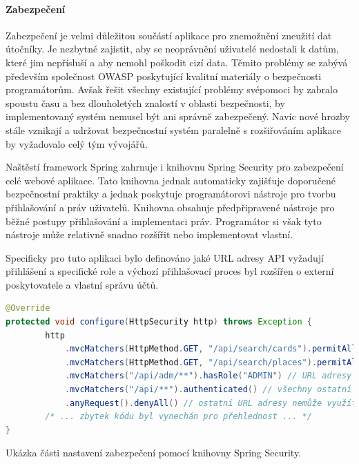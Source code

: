 \begin{itemize}
\begin{itemize}
			\paragraph{Zabezpečení}

			Zabezpečení je velmi důležitou součástí aplikace pro znemožnění zneužití dat útočníky.
			Je nezbytné zajistit, aby se neoprávnění uživatelé nedostali k datům, které jim nepřísluší a aby nemohl
			poškodit cizí data.
			Těmito problémy se zabývá především společnost OWASP poskytující kvalitní materiály o bezpečnosti programátorům.
			Avšak řešit všechny existující problémy svépomoci by zabralo spoustu času a bez dlouholetých znalostí v
			oblasti bezpečnosti, by implementovaný systém nemusel být ani správně zabezpečený.
			Navíc nové hrozby stále vznikají a udržovat bezpečnostní systém paralelně s rozšiřováním aplikace by vyžadovalo
			celý tým vývojářů.

			Naštěstí framework Spring zahrnuje i knihovnu Spring Security pro zabezpečení celé webové aplikace.
			Tato knihovna jednak automaticky zajišťuje doporučené bezpečnostní praktiky a jednak poskytuje programátorovi
			nástroje pro tvorbu přihlašování a práv uživatelů.
			Knihovna obsahuje předpřipravené nástroje pro běžné postupy přihlašování a implementaci práv.
			Programátor si však tyto nástroje může relativně snadno rozšířit nebo implementovat vlastní.

			Specificky pro tuto aplikaci bylo definováno jaké \ac{URL} adresy \ac{API} vyžadují přihlášení a specifické
			role a výchozí přihlašovací proces byl rozšířen o externí poskytovatele a vlastní správu účtů.

			\begin{lstlisting}[language=Java]
@Override
protected void configure(HttpSecurity http) throws Exception {
        http
            .mvcMatchers(HttpMethod.GET, "/api/search/cards").permitAll() // tuto URL adresu mohou využívat i nepřihlášení uživatelé
            .mvcMatchers(HttpMethod.GET, "/api/search/places").permitAll() // tuto URL adresu mohou využívat i nepřihlášení uživatelé
            .mvcMatchers("/api/adm/**").hasRole("ADMIN") // URL adresy s tímto vzorem mohou využít jen uživatelé s rolí ADMIN
            .mvcMatchers("/api/**").authenticated() // všechny ostatní URL adresy začínající "/api" prefixem využadují přihlášeného uživatele
            .anyRequest().denyAll() // ostatní URL adresy nemůže využít nikdo
        /* ... zbytek kódu byl vynechán pro přehlednost ... */
}
			\end{lstlisting}
			Ukázka části nastavení zabezpečení pomocí knihovny Spring Security. %


\end{itemize}
\end{itemize}
